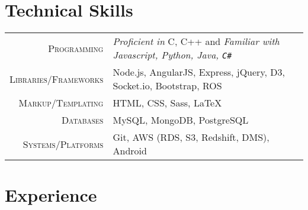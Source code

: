\documentclass[a4paper,10pt]{extarticle} %
\begin{document}

\section{Technical Skills}

\begin{tabular}{r|p{17cm}}
\textsc{Programming} & {\itshape{Proficient in}} C, C++ and \itshape{Familiar with} Javascript, Python, Java, \verb!C#! \\
\textsc{Libraries/Frameworks} & Node.js, AngularJS, Express, jQuery, D3, Socket.io, Bootstrap, ROS\\
\textsc{Markup/Templating} & HTML, CSS, Sass, \LaTeX\\
\textsc{Databases} & MySQL, MongoDB, PostgreSQL\\
\textsc{Systems/Platforms} & Git, AWS (RDS, S3, Redshift, DMS), Android
\end{tabular}

\section{Experience}
\end{document}
